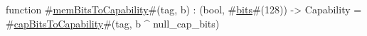 function #\hyperref[sailMIPSzmemBitsToCapability]{memBitsToCapability}#(tag, b) : (bool, #\hyperref[sailMIPSzbits]{bits}#(128)) -> Capability =
  #\hyperref[sailMIPSzcapBitsToCapability]{capBitsToCapability}#(tag, b ^ null_cap_bits)
